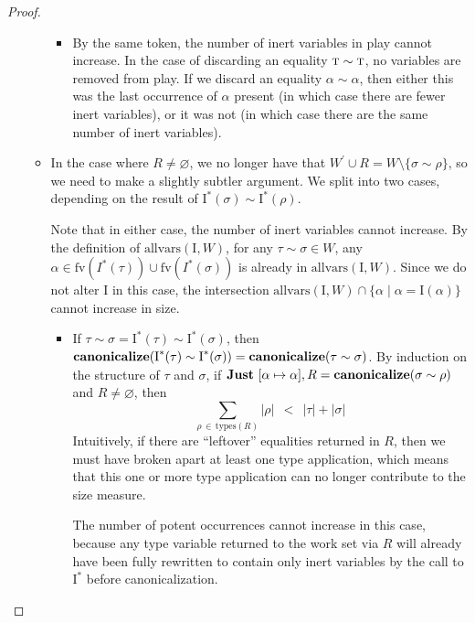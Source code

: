 \documentclass[10pt, letterpaper, oneside]{article}
\newcommand{\inertset}{\text{I}}
\newcommand{\fv}{\mathrm{fv}}
\begin{document}
\begin{proof}
\begin{itemize}
\begin{itemize}
\begin{itemize}
        \item By the same token, the number of inert variables in play cannot increase. In the case of discarding an equality \(\text{\sc t} \sim \text{\sc t}\), no variables are removed from play. If we discard an equality \(\alpha \sim \alpha\), then either this was the last occurrence of \(\alpha\) present (in which case there are fewer inert variables), or it was not (in which case there are the same number of inert variables).

      \end{itemize}

      \item In the case where \(R \ne \varnothing\), we no longer have that \(W^\prime \cup R = W \setminus \{\sigma \sim \rho\}\), so we need to make a slightly subtler argument. We split into two cases, depending on the result of \(\inertset^\ast(\sigma) \sim \inertset^\ast(\rho)\).

      Note that in either case, the number of inert variables cannot increase. By the definition of \(\text{allvars}(\inertset, W)\), for any \(\tau \sim \sigma \in W\), any \(\alpha \in \fv(I^\ast(\tau)) \cup \fv(I^\ast(\sigma))\) is already in \(\text{allvars}(\inertset, W)\). Since we do not alter \(\inertset\) in this case, the intersection \(\text{allvars}(\inertset, W) \cap \{\alpha \mid \alpha = \inertset(\alpha)\}\) cannot increase in size.

      \begin{itemize}

        \item If \(\tau \sim \sigma = \inertset^\ast(\tau) \sim \inertset^\ast(\sigma)\), then \(\text{\bf canonicalize}(\inertset^\ast(\tau) \sim \inertset^\ast(\sigma)) = \text{\bf canonicalize}(\tau \sim \sigma)\). By induction on the structure of \(\tau\) and \(\sigma\), if \(\text{\bf Just}~[\alpha \mapsto \alpha], R = \text{\bf canonicalize}(\sigma \sim \rho)\) and \(R \ne \varnothing\), then
        \begin{equation*}
          \sum_{\rho\,\in\,\text{types}(R)}\!\!\!\!\!\!\!\!|\rho|\ \ <\ \ |\tau| + |\sigma|
        \end{equation*}
        Intuitively, if there are ``leftover'' equalities returned in \(R\), then we must have broken apart at least one type application, which means that this one or more type application can no longer contribute to the size measure.

        The number of potent occurrences cannot increase in this case, because any type variable returned to the work set via \(R\) will already have been fully rewritten to contain only inert variables by the call to \(\inertset^\ast\) before canonicalization.


\end{itemize}
\end{itemize}
\end{itemize}
\end{proof}
\end{document}
